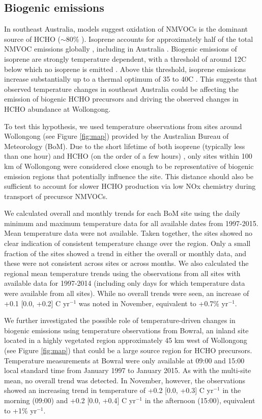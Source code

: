\documentclass[draft,linenumbers]{AGUJournal}
\begin{document}
\subsection{Biogenic emissions}
In southeast Australia, models suggest oxidation of NMVOCs is the dominant source of HCHO ($\sim$80\% \citep{Pfister2008}). Isoprene accounts for approximately half of the total NMVOC emissions globally \citep{Guenther2012}, including in Australia \citep{Emmerson2016}. Biogenic emissions of isoprene are strongly temperature dependent, with a threshold of around 12\degree C below which no isoprene is emitted \citep{Oku2014}. Above this threshold, isoprene emissions increase substantially up to a thermal optimum of 35 to 40\degree C \citep{Monson1992,Sharkey2001}. This suggests that observed temperature changes in southeast Australia \citep{ABS2012} could be affecting the emission of biogenic HCHO precursors and driving the observed changes in HCHO abundance at Wollongong.

To test this hypothesis, we used temperature observations from sites around Wollongong (see Figure \ref{fig:map}) provided by the Australian Bureau of Meteorology (BoM). Due to the short lifetime of both isoprene (typically less than one hour) \citep{Palmer2003,Crutzen1999} and HCHO (on the order of a few hours) \citep{Palmer2003,DeSmedt2015}, only sites within 100 km of Wollongong were considered close enough to be representative of biogenic emission regions that potentially influence the site. This distance should also be sufficient to account for slower HCHO production via low NOx chemistry during transport of precursor NMVOCs.

We calculated overall and monthly trends for each BoM site using the daily minimum and maximum temperature data for all available dates from 1997-2015. Mean temperature data were not available. Taken together, the sites showed no clear indication of consistent temperature change over the region. Only a small fraction of the sites showed a trend in either the overall or monthly data, and these were not consistent across sites or across months. We also calculated the regional mean temperature trends using the observations from all sites with available data for 1997-2014 (including only days for which temperature data were available from all sites). While no overall trends were seen, an increase of +0.1 [0.0, +0.2] \degree C yr$^{-1}$ was noted in November, equivalent to +0.7\% yr$^{-1}$.

We further investigated the possible role of temperature-driven changes in biogenic emissions using temperature observations from Bowral, an inland site located in a highly vegetated region approximately 45 km west of Wollongong (see Figure \ref{fig:map}) that could be a large source region for HCHO precursors. Temperature measurements at Bowral were only available at 09:00 and 15:00 local standard time from January 1997 to January 2015. As with the multi-site mean, no overall trend was detected. In November, however, the observations showed an increasing trend in temperature of +0.2 [0.0, +0.3] \degree C yr$^{-1}$ in the morning (09:00) and +0.2 [0.0, +0.4] \degree C yr$^{-1}$  in the afternoon (15:00), equivalent to +1\% yr$^{-1}$.
\end{document}
